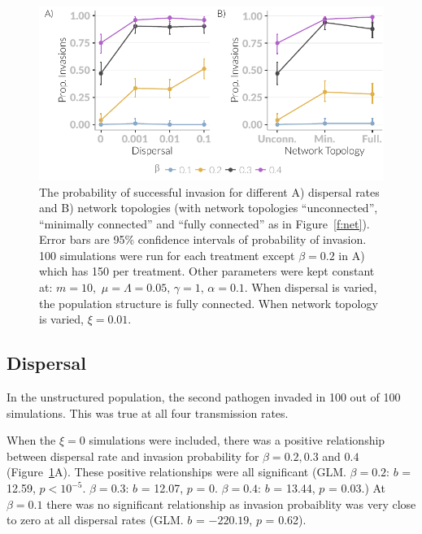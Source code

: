 \begin{knitrout}\footnotesize
{}\color{fgcolor}\begin{figure}[t]

{\centering \includegraphics[width=\textwidth]{figure/invasionPropPlots-1} 

}

\caption[The probability of invasion across different dispersal rates and network topologies.]{
  The probability of successful invasion for different A) dispersal rates and B) network topologies (with network topologies ``unconnected'', ``minimally connected'' and ``fully connected'' as in Figure~\ref{f:net}). 
  Error bars are 95\% confidence intervals of probability of invasion. 
  100 simulations were run for each treatment except $\beta = 0.2$ in A) which has 150 per treatment.
  Other parameters were kept constant at: $m = 10,\, \, \mu = \Lambda = 0.05,\, \gamma = 1,\, \alpha = 0.1$. 
  When dispersal is varied, the population structure is fully connected. 
  When network topology is varied, $\xi = 0.01$.}\label{f:invasionPropPlots}
\end{figure}


\end{knitrout}


\subsection{Dispersal}

In the unstructured population, the second pathogen invaded in 100 out of 100 simulations.
This was true at all four transmission rates.

When the $\xi = 0$ simulations were included, there was a positive relationship between dispersal rate and invasion probability for $\beta = 0.2, 0.3$ and $0.4$ (Figure~\ref{f:invasionPropPlots}A).
These positive relationships were all significant (GLM. $\beta = 0.2$: $b$ = 12.59, $p < 10^{-5}$. $\beta = 0.3$: $b$ = 12.07, $p$ = 0. $\beta = 0.4$: $b$ = 13.44, $p$ = 0.03.)
At $\beta = 0.1$ there was no significant relationship as invasion probaiblity was very close to zero at all dispersal rates (GLM. $b$ = \ensuremath{-220.19}, $p$ = 0.62).

